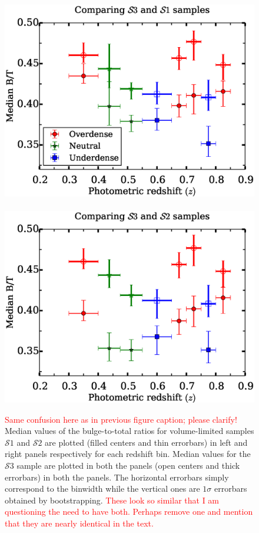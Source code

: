 \documentclass[twocolumn,useAMS,usenatbib]{mn2e}
\newcommand{\rachel}[1]{{\textcolor{red}{#1}}}
\newcommand{\s}{\ensuremath{\mathcal{S}}}
\begin{document}
\begin{figure}
 \includegraphics[width=1.0\columnwidth]{median_dvcbtt} \
 \includegraphics[width=1.0\columnwidth]{median_dvcbtt2}
  \caption{\rachel{Same confusion here as in previous figure caption;
      please clarify!} Median values of the bulge-to-total ratios for volume-limited samples \s$1$ and \s$2$ are plotted (filled centers and thin errorbars) in left and right panels respectively for each redshift bin.
          Median values for the \s$3$ sample are plotted in both the panels (open centers and thick errorbars) in both the panels.
          The horizontal errorbars simply correspond to the binwidth while the vertical ones are $1\sigma$ errorbars obtained by bootstrapping.  \rachel{These look so similar that I am questioning the need to have both.  Perhaps remove one and mention that they are nearly identical in the text.}}
 \label{fig:median_dvcbtt}
\end{figure}
\end{document}
